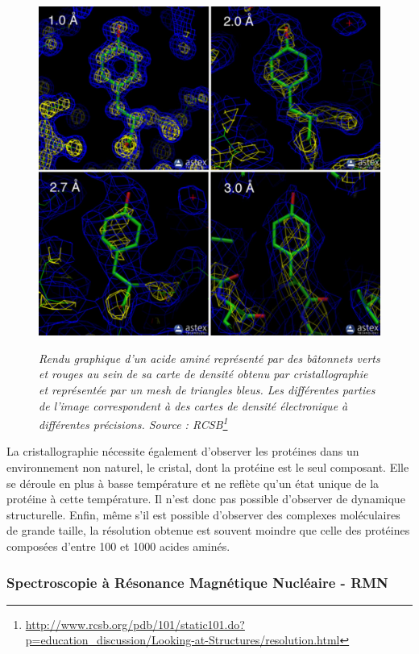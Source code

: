 \begin{figure}[htb]
  \centering
  {\includegraphics[width=0.5\linewidth]{./figures/ch1/resolution_xray.pdf}}
    \caption[Rendu graphique d'un acide aminé et de sa carte de densité obtenue par cristallographie.]{\it Rendu graphique d'un acide aminé représenté par des bâtonnets verts et rouges au sein de sa carte de densité obtenu par cristallographie et représentée par un mesh de triangles bleus. Les différentes parties de l'image correspondent à des cartes de densité électronique à différentes précisions. Source : RCSB\footnote{\url{http://www.rcsb.org/pdb/101/static101.do?p=education_discussion/Looking-at-Structures/resolution.html}}}
    \label{Fig:resolution_xray}
  \hspace{0.2cm}
\end{figure}


La cristallographie nécessite également d'observer les protéines dans un environnement non naturel, le cristal, dont la protéine est le seul composant. Elle se déroule en plus à basse température et ne reflète qu'un état unique de la protéine à cette température. Il n'est donc pas possible d'observer de dynamique structurelle. Enfin, même s'il est possible d'observer des complexes moléculaires de grande taille, la résolution obtenue est souvent moindre que celle des protéines composées d'entre 100 et 1000 acides aminés.



\subsubsection{Spectroscopie à Résonance Magnétique Nucléaire - RMN}

